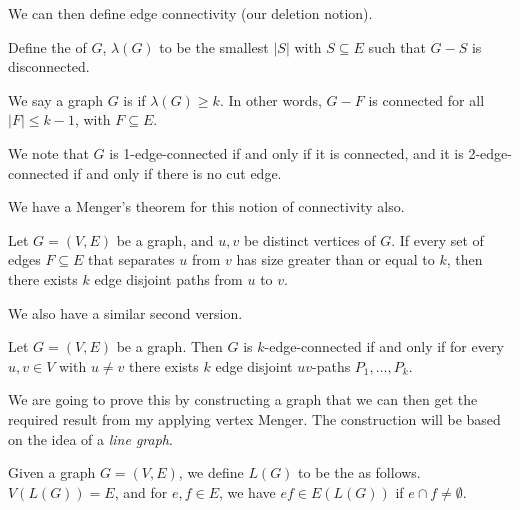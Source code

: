 We can then define edge connectivity (our deletion notion).

\begin{definition}
	Define the  of $G$, $\lambda(G)$ to be the smallest $|S|$ with $S \subseteq E$ such that $G - S$ is disconnected.
\end{definition}
\begin{definition}
	We say a graph $G$ is  if $\lambda(G) \geq k$. In other words, $G - F$ is connected for all $|F|\leq k - 1$, with $F \subseteq E$. 
\end{definition}

We note that $G$ is 1-edge-connected if and only if it is connected, and it is 2-edge-connected if and only if there is no cut edge.

We have a Menger's theorem for this notion of connectivity also.

\begin{theorem}
	Let $G = (V, E)$ be a graph, and $u, v$ be distinct vertices of $G$. If every set of edges $F \subseteq E$ that separates $u$ from $v$ has size greater than or equal to $k$, then there exists $k$ edge disjoint paths from $u$ to $v$.
\end{theorem}

We also have a similar second version.

\begin{theorem}
Let $G = (V, E)$ be a graph. Then $G$ is $k$-edge-connected if and only if for every $u, v \in V$ with $u \neq v$ there exists $k$ edge disjoint $uv$-paths $P_1, \dots, P_k$.
\end{theorem}

We are going to prove this by constructing a graph that we can then get the required result from my applying vertex Menger. The construction will be based on the idea of a \emph{line graph}.

\begin{definition}
	Given a graph $G = (V, E)$, we define $L(G)$ to be the  as follows.
	$V(L(G)) = E$, and for $e, f \in E$, we have $ef \in E(L(G))$ if $e \cap f \neq \emptyset$.
\end{definition}

